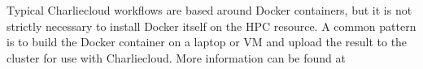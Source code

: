 \begin{center}
\begin{tcolorbox}[]
\small
Typical Charliecloud workflows are based around Docker containers, but it is not
strictly necessary to install Docker itself on the HPC resource. A common
pattern is to build the Docker container on a laptop or VM and upload the result
to the cluster for use with Charliecloud. More information can be found at
\href{https://hpc.github.io/charliecloud/}
    {\color{blue}{https://hpc.github.io/charliecloud/}}
\end{tcolorbox}
\end{center}
